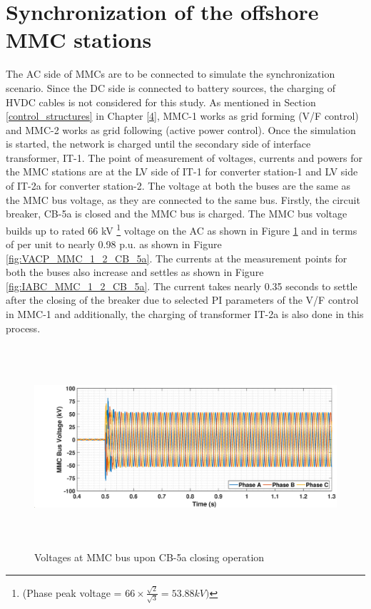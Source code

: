 \section{Synchronization of the offshore MMC stations}
The \gls{AC} side of \gls{MMC}s are to be connected to simulate the synchronization scenario. Since the \gls{DC} side is connected to battery sources, the charging of \gls{HVDC} cables is not considered for this study. As mentioned in Section \ref{control_structures} in Chapter \ref{4}, \gls{MMC}-1 works as grid forming (V/F control) and \gls{MMC}-2 works as grid following (active power control). Once the simulation is started, the network is charged until the secondary side of interface transformer, IT-1. The point of measurement of voltages, currents and powers for the \gls{MMC} stations are at the \gls{LV} side of IT-1 for converter station-1 and \gls{LV} side of IT-2a for converter station-2. The voltage at both the buses are the same as the \gls{MMC} bus voltage, as they are connected to the same bus. Firstly, the circuit breaker, CB-5a is closed and the \gls{MMC} bus is charged. The \gls{MMC} bus voltage builds up to rated 66 kV \footnote{(Phase peak voltage = $66\times \frac{\sqrt{2}}{\sqrt{3}} = 53.88 kV)$} voltage on the \gls{AC} as shown in Figure \ref{fig:VABC_MMC_1_2_CB_5a} and in terms of per unit to nearly 0.98 p.u. as shown in Figure \ref{fig:VACP_MMC_1_2_CB_5a}. The currents at the measurement points for both the buses also increase and settles as shown in Figure \ref{fig:IABC_MMC_1_2_CB_5a}. The current takes nearly 0.35 seconds to settle after the closing of the breaker due to selected \gls{PI} parameters of the V/F control in \gls{MMC}-1 and additionally, the charging of transformer IT-2a is also done in this process. 

\begin{figure}[H]
    \includegraphics[height = 7.5cm,width = \textwidth]{Diagrams/Chapter_5/VABC_MMC_1_2_CB_5a.eps}
    \caption{Voltages at MMC bus upon CB-5a closing operation}
    \label{fig:VABC_MMC_1_2_CB_5a}
\end{figure}

